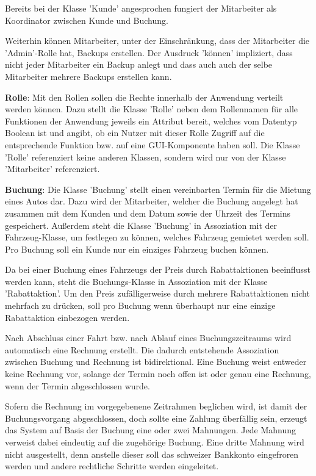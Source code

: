 Bereits bei der Klasse 'Kunde' angesprochen fungiert der Mitarbeiter als Koordinator zwischen Kunde und Buchung. 

Weiterhin können Mitarbeiter, unter der Einschränkung, dass der Mitarbeiter die 'Admin'-Rolle hat, Backups erstellen. Der Ausdruck 'können' impliziert, dass nicht jeder Mitarbeiter ein Backup anlegt und dass auch auch der selbe Mitarbeiter mehrere Backups erstellen kann. 

\textbf{Rolle}: Mit den Rollen sollen die Rechte innerhalb der Anwendung verteilt werden können. Dazu stellt die Klasse 'Rolle' neben dem Rollennamen für alle Funktionen der Anwendung jeweils ein Attribut bereit, welches vom Datentyp Boolean ist und angibt, ob ein Nutzer mit dieser Rolle Zugriff auf die entsprechende Funktion bzw. auf eine GUI-Komponente haben soll. Die Klasse 'Rolle' referenziert keine anderen Klassen, sondern wird nur von der Klasse 'Mitarbeiter' referenziert.

\textbf{Buchung}: Die Klasse 'Buchung' stellt einen vereinbarten Termin für die Mietung eines Autos dar. Dazu wird der Mitarbeiter, welcher die Buchung angelegt hat zusammen mit dem Kunden und dem Datum sowie der Uhrzeit des Termins gespeichert. Außerdem steht die Klasse 'Buchung' in Assoziation mit der Fahrzeug-Klasse, um festlegen zu können, welches Fahrzeug gemietet werden soll. Pro Buchung soll ein Kunde nur ein einziges Fahrzeug buchen können.

Da bei einer Buchung eines Fahrzeugs der Preis durch Rabattaktionen beeinflusst werden kann, steht die Buchungs-Klasse in Assoziation mit der Klasse 'Rabattaktion'. Um den Preis zufälligerweise durch mehrere Rabattaktionen nicht mehrfach zu drücken, soll pro Buchung wenn überhaupt nur eine einzige Rabattaktion einbezogen werden.

Nach Abschluss einer Fahrt bzw. nach Ablauf eines Buchungszeitraums wird automatisch eine Rechnung erstellt. Die dadurch entstehende Assoziation zwischen Buchung und Rechnung ist bidirektional. Eine Buchung weist entweder keine Rechnung vor, solange der Termin noch offen ist oder genau eine Rechnung, wenn der Termin abgeschlossen wurde.

Sofern die Rechnung im vorgegebenene Zeitrahmen beglichen wird, ist damit der Buchungsvorgang abgeschlossen, doch sollte eine Zahlung überfällig sein, erzeugt das System auf Basis der Buchung eine oder zwei Mahnungen. Jede Mahnung verweist dabei eindeutig auf die zugehörige Buchung. Eine dritte Mahnung wird nicht ausgestellt, denn anstelle dieser soll das schweizer Bankkonto eingefroren werden und andere rechtliche Schritte werden eingeleitet. 


